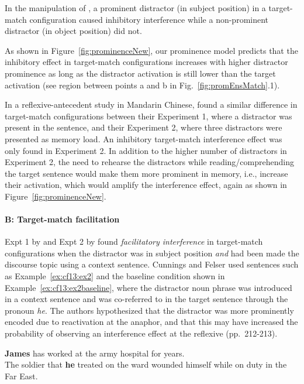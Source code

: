 \documentclass{cambridge7A}\usepackage[]{graphicx}\usepackage[]{color}
\newcommand{\revFE}[1]{#1}
\begin{document}
In the manipulation of \cite{VanDykeMcElree2011}, a prominent distractor (in subject position) in a target-match configuration caused inhibitory interference while a non-prominent distractor (in object position) did not. 
\revFE{
As shown in Figure~\ref{fig:prominenceNew}, our prominence model predicts that the inhibitory effect in target-match configurations increases with higher distractor prominence as long as the distractor activation is still lower than the target activation (see region between points a and b in Fig.~\ref{fig:promEnsMatch}.1).
}

In a reflexive-antecedent study in Mandarin Chinese, \cite{JaegerEngelmannVasishth2015} found a similar difference in target-match configurations between their Experiment 1, where a distractor was present in the sentence, and their Experiment 2, where three distractors were presented as memory load. An inhibitory target-match interference effect was only found in Experiment 2. 
In addition to the higher number of distractors in Experiment 2, the need to rehearse the distractors 
while reading/comprehending the target sentence
 would make them more prominent in memory, i.e., increase their activation, which would amplify the interference effect, again as shown in Figure~\ref{fig:prominenceNew}.

\paragraph{B: Target-match facilitation}
Expt 1 by \cite{Sturt2003} and Expt 2 by \cite{CunningsFelser2013} found \emph{facilitatory interference} in target-match configurations when the distractor was in subject position \emph{and} had been made the discourse topic using a context sentence.
Cunnings and Felser used sentences such as Example~\ref{ex:cf13:ex2} and the baseline condition shown in Example~\ref{ex:cf13:ex2baseline}, where the distractor noun phrase was introduced in a context sentence and was co-referred to in the target sentence through the pronoun \textit{he}. 
The authors hypothesized that the distractor was more prominently encoded due to reactivation at the anaphor, and that this
may have increased the probability of observing an interference effect at the reflexive (pp.\ 212-213). 
%
\begin{exe} 
\ex\label{ex:cf13:ex2}
\textbf{James} has worked at the army hospital for years. \\
The soldier that \textbf{he} treated on the ward wounded himself while on duty in the Far East.
\end{exe}
\end{document}
